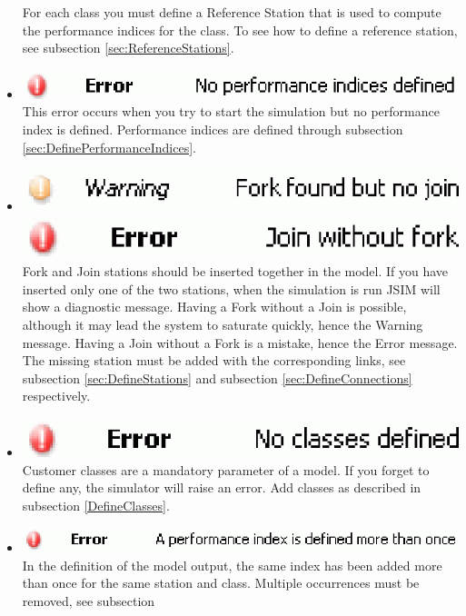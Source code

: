 \begin{description*}
\begin{itemize}
 For each class you must define a Reference Station that is used to compute the performance indices for the class. To see how to define a reference  station, see subsection \ref{sec:ReferenceStations}.
\item \includegraphics[scale=.5]{img/jsim/4.eps}\\
This error occurs when you try to start the simulation but no performance index is defined. Performance indices are defined through subsection \ref{sec:DefinePerformanceIndices}.
\item \includegraphics[scale=.5]{img/jsim/5.eps}\\
\includegraphics[scale=.5]{img/jsim/9.eps}\\
Fork and Join stations should be inserted together in the model.
If you have inserted only one of the two stations, when the
simulation is run JSIM will show a diagnostic message. Having a
Fork without a Join is possible, although it may lead the system
to saturate quickly, hence the Warning message. Having a Join
without a Fork is a mistake, hence the Error message. The missing
station must be added with the corresponding links, see subsection
\ref{sec:DefineStations} and subsection
\ref{sec:DefineConnections} respectively.
\item \includegraphics[scale=.5]{img/jsim/6.eps}\\
Customer classes are a mandatory parameter of a model. If you forget to define any, the simulator will raise an error. Add classes as described in subsection \ref{DefineClasses}.
\item \includegraphics[scale=.5]{img/jsim/10.eps}\\
In the definition of the model output, the same index has been added more than once for the same station and class. Multiple occurrences must be removed, see subsection

\end{itemize}
\end{description*}
